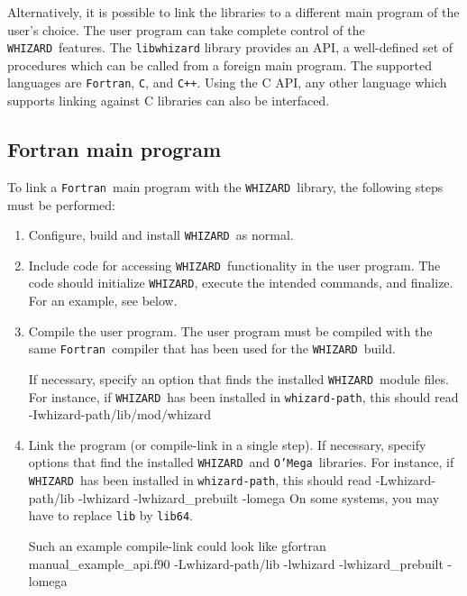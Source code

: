 \documentclass[12pt]{book}
\newenvironment{code}%
  {\begingroup\footnotesize
   \quote
   \Verbatim}%
  {\endVerbatim
   \endquote
   \endgroup\noindent}
\newcommand{\ttt}[1]{\texttt{#1}}
\newcommand{\whizard}{\ttt{WHIZARD}}
\newcommand{\oMega}{\ttt{O'Mega}}
\newcommand{\cpp}{\ttt{C++}}
\newcommand{\fortran}{\ttt{Fortran}}
\begin{document}
Alternatively, it is possible to link the libraries to a different main
program of the user's choice.  The user program can take complete control of
the \whizard\ features.  The \ttt{libwhizard} library provides an API, a
well-defined set of procedures which can be called from a foreign main
program.  The supported languages are \fortran, \ttt{C}, and \cpp.
Using the C API, any other language which supports linking against C
libraries can also be interfaced.

\subsection{Fortran main program}

To link a \fortran\ main program with the \whizard\ library, the following steps
must be performed:
\begin{enumerate}
\item
  Configure, build and install \whizard\ as normal.
\item
  Include code for accessing \whizard\ functionality in the user program.
  The code should initialize
  \whizard, execute the intended commands, and finalize.  For an example, see
  below.
\item
  Compile the user program.   The user program must be
  compiled with the same \fortran\ compiler that has been used for the \whizard\
  build.

  If necessary, specify an option that finds the
  installed \whizard\ module files.
  For instance, if \whizard\ has been installed in \ttt{whizard-path}, this
  should read
  \begin{code}
    -Iwhizard-path/lib/mod/whizard
  \end{code}
\item
  Link the program (or compile-link in a single step).  If necessary, specify
  options that find the installed \whizard\ and \oMega\ libraries.  For
  instance, if \whizard\ has been installed in \ttt{whizard-path}, this should
  read
  \begin{code}
    -Lwhizard-path/lib -lwhizard -lwhizard_prebuilt -lomega
  \end{code}
  On some systems, you may have to replace \ttt{lib} by \ttt{lib64}.

  Such an example compile-link could look like
  \begin{code}
    gfortran manual_example_api.f90 -Lwhizard-path/lib -lwhizard -lwhizard_prebuilt -lomega
  \end{code}


\end{enumerate}
\end{document}
